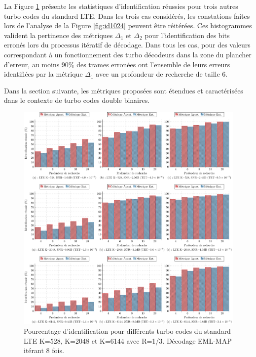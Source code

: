 \newpage
La Figure \ref{fig:idLTE} présente les statistiques d'identification réussies pour trois autres turbo codes du standard 
LTE. Dans les trois cas considérés, les constations faites lors de l'analyse de la Figure \ref{fig:id1024} peuvent être 
réitérées. Ces histogrammes valident la pertinence des métriques $\Delta_1$ et $\Delta_2$ pour l'identification des bits 
erronés lors du processus itératif de décodage. Dans tous les cas, pour des valeurs correspondant à un fonctionnement des 
turbo décodeurs dans la zone du plancher d'erreur, au moins 90\% des trames erronées ont l'ensemble de leurs erreurs 
identifiées par la métrique $\Delta_1$ avec un profondeur de recherche de taille 6.

Dans la section suivante, les métriques proposées sont étendues et caractérisées dans le contexte de turbo codes double 
binaires.

\begin{figure}[!h]
	\centering
	\hspace*{-1cm}
	\includegraphics[width=1.05\textwidth]{main/ch3_fig/id2/tikz/lte.pdf}
	\caption{Pourcentage d'identification pour différents turbo codes du standard LTE K=528, K=2048 et K=6144 avec R=1/3.
	Décodage EML-MAP itérant 8 fois. \label{fig:idLTE}}
\end{figure}

